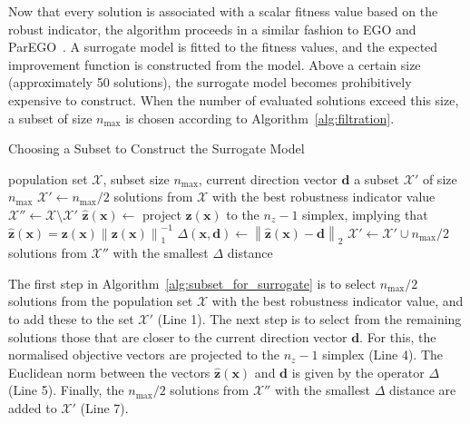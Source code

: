 \documentclass{llncs}
\newcommand{\brr}[1]{{\left({#1}\right)}} %
\newcommand{\norm}[2]{\left\|{#1}\right\|_{#2}} %
\newcommand{\vx}{\mathbf{x}} %
\newcommand{\vz}{\mathbf{z}} %
\newcommand{\vd}{\mathbf{d}} %
\newcommand{\XSet}{\mathcal{X}} %
\begin{document}
Now that every solution is associated with a scalar fitness value based on the robust indicator, the algorithm proceeds in a similar fashion to EGO and ParEGO~\cite{Jones1998Efficient,knowles2005multiobjective}. A surrogate model is fitted to the fitness values, and the expected improvement function is constructed from the model. Above a certain size (approximately 50 solutions), the surrogate model becomes prohibitively expensive to construct. When the number of evaluated solutions exceed this size, a subset of size $n_\text{max}$ is chosen according to Algorithm~\ref{alg:filtration}.

\begin{algorithm}
\caption{Choosing a Subset to Construct the Surrogate Model}
\label{alg:filtration}
\begin{algorithmic}[1]
	\Require population set $\XSet$, subset size $n_\text{max}$, current direction vector $\vd$
	\Ensure a subset $\XSet'$ of size $n_\text{max}$
	\State $\XSet' \leftarrow n_\text{max}/2$ solutions from $\XSet$ with the best robustness indicator value
	\State $\XSet'' \leftarrow \XSet \setminus \XSet'$
	\ForAll{$\vx \in \XSet''$}
		\State $\hat{\vz}\brr{\vx} \leftarrow$ project $\vz\brr{\vx}$ to the $n_z-1$ simplex, implying that $\hat{\vz}\brr{\vx} = \vz\brr{\vx} \norm{\vz\brr{\vx}}{1}^{-1}$
		\State $\Delta\brr{\vx, \vd} \leftarrow \norm{\hat{\vz}\brr{\vx} - \vd}{2}$
	\EndFor
	\State $\XSet' \leftarrow \XSet' \cup n_\text{max}/2$ solutions from $\XSet''$ with the smallest $\Delta$ distance
\end{algorithmic}
\label{alg:subset_for_surrogate}
\end{algorithm}

The first step in Algorithm~\ref{alg:subset_for_surrogate} is to select $n_\text{max}/2$ solutions from the population set $\XSet$ with the best robustness indicator value, and to add these to the set $\XSet'$ (Line 1). The next step is to select from the remaining solutions those that are closer to the current direction vector $\vd$. For this, the normalised objective vectors are projected to the $n_z-1$ simplex (Line 4). The Euclidean norm between the vectors $\hat{\vz}\brr{\vx}$ and $\vd$ is given by the operator $\Delta$ (Line 5). Finally, the $n_\text{max}/2$ solutions from $\XSet''$ with the smallest $\Delta$ distance are added to $\XSet'$ (Line 7).
\end{document}
